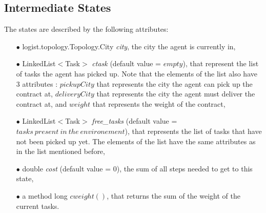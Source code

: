 \documentclass[11pt]{article}
\begin{document}
\subsection{Intermediate States}
The states are described by the following attributes:
\begin{itemize}
	\item[$\bullet$] logist.topology.Topology.City \emph{city}, the city the agent is currently in,
	\item[$\bullet$] LinkedList$<$Task$>$ \emph{ctask} (default value = $empty$), that represent the list of tasks the agent has picked up. Note that the elements of the list also have 3 attributes : $pickupCity$ that represents the city the agent can pick up the contract at, $deliveryCity$ that represents the city the agent must deliver the contract at, and $weight$ that represents the weight of the contract,
	\item[$\bullet$] LinkedList$<$Task$>$ \emph{free\_tasks} (default value = $tasks\ present\ in\ the\ environement$), that represents the list of tasks that have not been picked up yet. The elements of the list have the same attributes as in the list mentioned before,
	\item[$\bullet$] double \emph{cost} (default value = $0$), the sum of all steps needed to get to this state, 
	\item[$\bullet$] a method long $cweight()$, that returns the sum of the weight of the current tasks.
\end{itemize}
\end{document}
